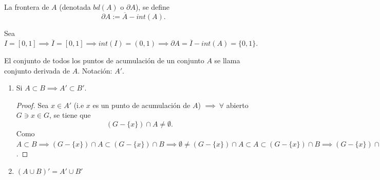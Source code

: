 \begin{definicion}
	La frontera de $A$ (denotada $bd(A)$ o $\partial A$), se define $$\partial A := \overline{A}-int(A).$$
	\begin{ejemplo}
		Sea $I=[0,1]\implies \overline{I}=[0,1]\implies int(I)=(0,1)\implies \partial A = \overline{I}-int(A)=\{0,1\}$. 
	\end{ejemplo}
\end{definicion}

\begin{definicion}
	El conjunto de todos los puntos de acumulación de un conjunto $A$ se llama conjunto derivada de $A$. Notación: $A'$. 
\end{definicion}

\begin{prop}
	\begin{enumerate}
		\item Si $A\subset B\implies A'\subset B'$. \begin{proof}
			Sea $x\in A'$ (i.e $x$ es un punto de acumulación de $A$) $\implies \ \forall $ abierto $G\ni x\in G$, se tiene que 
			$$(G-\{x\})\cap A\neq \emptyset.$$
			Como $A\subset B\implies (G-\{x\})\cap A\subset (G-\{x\})\cap B\implies \emptyset \neq (G-\{x\})\cap A\subset A \subset (G-\{x\})\cap B\implies (G-\{x\})\cap B\neq \emptyset, \forall G\ni x\in G\implies x\in B'$. 
		\end{proof}
	\item $(A\cup B)'=A'\cup B'$
	\end{enumerate}
\end{prop}